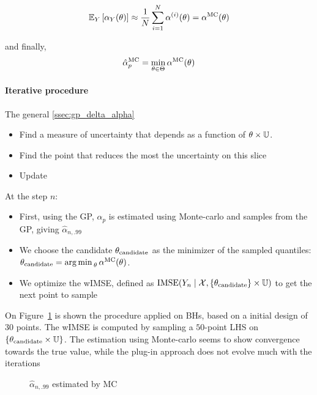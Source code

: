 \documentclass[../../Main_ManuscritThese.tex]{subfiles}
\newcommand{\IMSE}{\mathop{\mathrm{IMSE}}}
\begin{document}
\begin{equation}
 \mathbb{E}_{Y}\left[\alpha_{Y}(\theta) \right] \approx \frac{1}{N} \sum_{i=1}^N \alpha^{(i)}(\theta) = \alpha^{\mathrm{MC}}(\theta)
\end{equation}

and finally,
\begin{equation}
  \hat{\alpha}_p^{\mathrm{MC}} = \min_{\theta \in \Theta} \alpha^{\mathrm{MC}}(\theta)
\end{equation}


\paragraph{Iterative procedure}
The general
\cref{ssec:gp_delta_alpha}
\begin{itemize}
\item Find a measure of uncertainty that depends as a function of $\theta \times \mathbb{U}$.
\item Find the point that reduces the most the uncertainty on this slice
\item Update
\end{itemize}

At the step $n$:
\begin{itemize}
\item First, using the GP, $\alpha_p$ is estimated using Monte-carlo and samples from the GP, giving $\hat{\alpha}_{n,.99}$
\item We choose the candidate $\theta_{\mathrm{candidate}}$ as the minimizer of the sampled quantiles: $\theta_{\mathrm{candidate}} = \operatorname*{arg\,min \,}_{\theta} \alpha^{\mathrm{MC}}(\theta)$.
\item We optimize the wIMSE, defined as $\IMSE(Y_n \mid \mathcal{X}, \{\kk_{\mathrm{candidate}}\}\times \Uspace )$ to get the next point to sample
\end{itemize}
On Figure~\cref{fig:alpha_MC} is shown the procedure applied on BHs, based on a initial design of $30$ points. The wIMSE is computed by sampling a $50$-point LHS on $\{\theta_{\mathrm{candidate}} \times \mathbb{U}\}$.
The estimation using Monte-carlo seems to show convergence towards the true value, while the plug-in approach does not evolve much with the iterations
\begin{figure}[!h]
  \centering
  
  \label{fig:alpha_MC}
  \caption{$\hat{\alpha}_{n,.99}$ estimated by MC }
\end{figure}

%   
\end{document}
